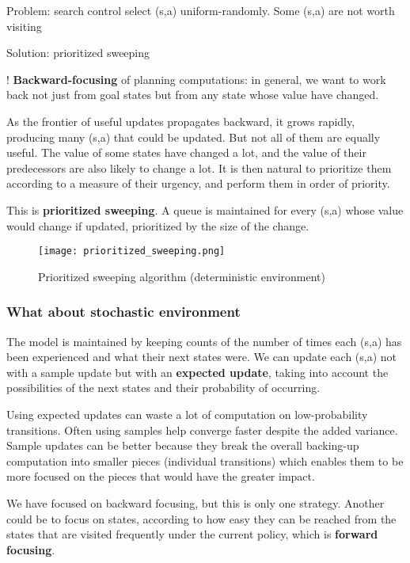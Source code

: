 \documentclass[sutton_barto_notes.tex]{subfiles}
\begin{document}
Problem: search control select (s,a) uniform-randomly. Some (s,a) are not worth visiting

Solution: prioritized sweeping

! \textbf{Backward-focusing } of planning computations: in general, we want to work back not just from goal states but from any state whose value have changed.

As the frontier of useful updates propagates backward, it grows rapidly, producing many (s,a) that could be updated. But not all of them are equally useful. The value of some states have changed a lot, and the value of their predecessors are also likely to change a lot. It is then natural to prioritize them according to a measure of their urgency, and perform them in order of priority.

This is \textbf{prioritized sweeping}. A queue is maintained for every (s,a) whose value would change if updated, prioritized by the size of the change.

\begin{figure}[h!]
    \centering
    \texttt{[image: prioritized\_sweeping.png]}
    \caption{ Prioritized sweeping algorithm (deterministic environment) }
\end{figure}



\subsubsection{What about stochastic environment}

The model is maintained by keeping counts of the number of times each (s,a) has been experienced and what their next states were. We can update each (s,a) not with a sample update but with an \textbf{expected update}, taking into account the possibilities of the next states and their probability of occurring.

Using expected updates can waste a lot of computation on low-probability transitions. Often using samples help converge faster despite the added variance. Sample updates can be better because they break the overall backing-up computation into smaller pieces (individual transitions) which enables them to be more focused on the pieces that would have the greater impact.



We have focused on backward focusing, but this is only one strategy. Another could be to focus on states, according to how easy they can be reached from the states that are visited frequently under the current policy, which is \textbf{forward focusing}.
\end{document}
